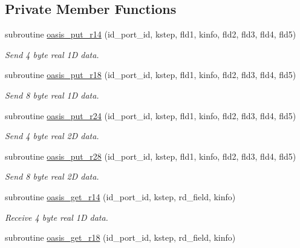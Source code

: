 \subsection*{Private Member Functions}
\begin{DoxyCompactItemize}
\item 
subroutine \hyperlink{classmod__oasis__getput__interface_a3ecaceac872ddf003a810f26b4c03f28}{oasis\+\_\+put\+\_\+r14} (id\+\_\+port\+\_\+id, kstep, fld1, kinfo, fld2, fld3, fld4, fld5)
\begin{DoxyCompactList}\small\item\em Send 4 byte real 1\+D data. \end{DoxyCompactList}\item 
subroutine \hyperlink{classmod__oasis__getput__interface_a021f5e4f2baa2e729816e97c6cf8df4d}{oasis\+\_\+put\+\_\+r18} (id\+\_\+port\+\_\+id, kstep, fld1, kinfo, fld2, fld3, fld4, fld5)
\begin{DoxyCompactList}\small\item\em Send 8 byte real 1\+D data. \end{DoxyCompactList}\item 
subroutine \hyperlink{classmod__oasis__getput__interface_a4536f2b61cf8190bf83f7dbf3dae9eb5}{oasis\+\_\+put\+\_\+r24} (id\+\_\+port\+\_\+id, kstep, fld1, kinfo, fld2, fld3, fld4, fld5)
\begin{DoxyCompactList}\small\item\em Send 4 byte real 2\+D data. \end{DoxyCompactList}\item 
subroutine \hyperlink{classmod__oasis__getput__interface_a3fa517cd2498afe1e0e38b58d186ee53}{oasis\+\_\+put\+\_\+r28} (id\+\_\+port\+\_\+id, kstep, fld1, kinfo, fld2, fld3, fld4, fld5)
\begin{DoxyCompactList}\small\item\em Send 8 byte real 2\+D data. \end{DoxyCompactList}\item 
subroutine \hyperlink{classmod__oasis__getput__interface_a2c56f0b77e74cceed2553583f6ccb2a2}{oasis\+\_\+get\+\_\+r14} (id\+\_\+port\+\_\+id, kstep, rd\+\_\+field, kinfo)
\begin{DoxyCompactList}\small\item\em Receive 4 byte real 1\+D data. \end{DoxyCompactList}\item 
subroutine \hyperlink{classmod__oasis__getput__interface_a11a6b191557bac5677f77c8af755958b}{oasis\+\_\+get\+\_\+r18} (id\+\_\+port\+\_\+id, kstep, rd\+\_\+field, kinfo)

\end{DoxyCompactItemize}
